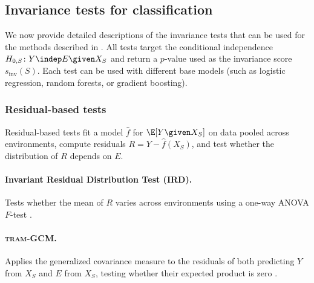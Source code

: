 
\subsection{Invariance tests for classification} \label{app:invariance_tests}


We now provide detailed descriptions of the invariance tests that can be used for the methods described in . All tests target the conditional independence $H_{0,S}\colon Y \indep E \given X_S$ and return a $p$-value used as the invariance score $s_\mathrm{inv}(S)$. Each test can be used with different base models (such as logistic regression, random forests, or gradient boosting).


\subsubsection{Residual-based tests}

Residual-based tests fit a model $\hat{f}$ for $\E[Y \given X_S]$ on data pooled across environments, compute residuals $R = Y - \hat{f}(X_S)$, and test whether the distribution of $R$ depends on $E$.

\paragraph{Invariant Residual Distribution Test (IRD).}
Tests whether the mean of $R$ varies across environments using a one-way ANOVA $F$-test \citep[adapted from][]{heinze-demlInvariantCausalPrediction2018}.

\paragraph{\textsc{tram}-GCM.}
Applies the generalized covariance measure \citep{shahHardnessConditionalIndependence2018} to the residuals of both predicting $Y$ from $X_S$ and $E$ from $X_S$, testing whether their expected product is zero \citep{kookModelbasedCausalFeature2023}.


